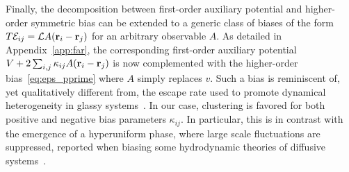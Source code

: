 \documentclass[superscriptaddress, twocolumn, prx, longbibliography, nofootinbib]{revtex4-1}
\begin{document}
Finally, the decomposition between first-order auxiliary potential and higher-order symmetric bias can be extended to a generic class of biases of the form $T{\cal E}_{ij} = {\cal L} A({\bf r}_i-{\bf r}_j)$ for an arbitrary observable $A$. As detailed in Appendix~\ref{app:far}, the corresponding first-order auxiliary potential $V+2\sum_{i,j}\kappa_{ij}A({\bf r}_i-{\bf r}_j)$ is now complemented with the higher-order bias~\eqref{eq:eps_pprime} where $A$ simply replaces $v$. Such a bias is reminiscent of, yet qualitatively different from, the escape rate used to promote dynamical heterogeneity in glassy systems~\cite{Pitard2011, Fullerton2013}. In our case, clustering is favored for both positive and negative bias parameters $\kappa_{ij}$. In particular, this is in contrast with the emergence of a hyperuniform phase, where large scale fluctuations are suppressed, reported when biasing some hydrodynamic theories of diffusive systems~\cite{Jack2015b}.
\end{document}
